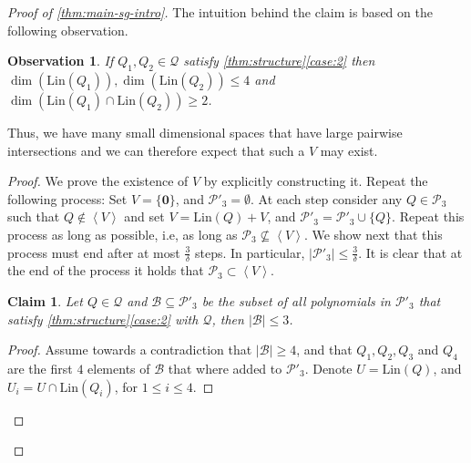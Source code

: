 \documentclass[10pt,a4paper]{article}
\newtheorem{claim}[theorem]{Claim}
\newtheorem{observation}[theorem]{Observation}
\renewcommand{\vec}[1]{{\mathbf{#1}}}
\newcommand{\cB}{{\mathcal{B}}}
\newcommand{\cQ}{{\mathcal{Q}}}
\newcommand{\calP}{{\mathcal{P}}}
\newcommand{\ideal}[1]{\left \langle{#1}\right \rangle}
\newcommand{\MS}{\text{Lin}}
\begin{document}
\begin{proof}[Proof of \autoref{thm:main-sg-intro}]
The intuition  behind the claim is based on the following observation.

\begin{observation}\label{rem:4-2-dim}
If $Q_1,Q_2 \in \cQ$ satisfy \autoref{thm:structure}\ref{case:2} then $\dim(\MS(Q_1)), \dim(\MS(Q_2)) \leq 4$ and $\dim(\MS(Q_1)\cap\MS(Q_2)) \geq 2$. 
\end{observation}

Thus, we have many small dimensional spaces that have large pairwise intersections and we can therefore expect that such a $V$ may exist.


\begin{proof}
We prove the existence of $V$ by explicitly constructing it.
Repeat the following process: Set $V = \{\vec{0}\}$, and $\calP'_3=\emptyset$. At each step consider any $Q \in \calP_3$ such that $Q\notin \ideal{V}$ and set $V =\MS(Q) + V$, and $\calP'_3=\calP'_3 \cup \{Q\}$. Repeat this process as long as possible, i.e, as long as $\calP_3 \not \subseteq \ideal{V}$. We  show next that this process must end after at most $\frac{3}{\delta}$ steps. In particular, $|\calP'_3| \leq \frac{3}{\delta}$. It is clear that at the end of the process it holds that $\calP_3 \subset \ideal{V}$.





\begin{claim}\label{cla:3-case3}
Let $Q\in \cQ$ and $\cB\subseteq \calP'_3$ be the subset of all polynomials in $\calP'_3$ that satisfy \autoref{thm:structure}\ref{case:2} with $\cQ$, then $|\cB| \leq 3$.
\end{claim}

\begin{proof}
Assume towards a contradiction that $|\cB| \geq 4$, and that $Q_1,Q_2,Q_3$ and $Q_4$ are the first $4$ elements of $\cB$ that where added to $\calP'_3$. Denote $U=\MS(Q)$, and  $U_i = U\cap \MS(Q_i)$, for $1\leq i \leq 4$.


\end{proof}
\end{proof}
\end{proof}
\end{document}
